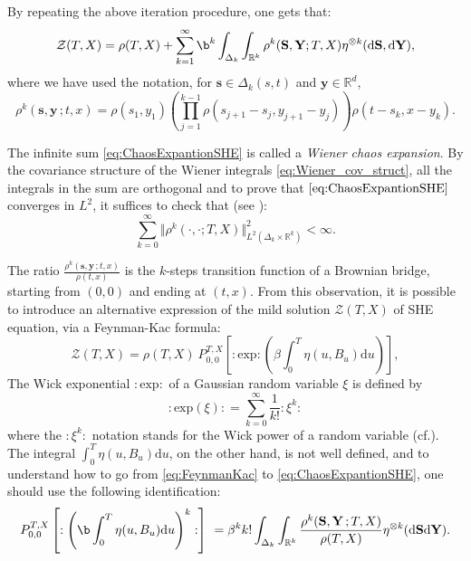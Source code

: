 By repeating the above iteration procedure, one gets that:
\begin{equation} \label{eq:ChaosExpantionSHE}
\mathcal{Z}(T,X) = \rho(T,X) + \sum_{k=1}^\infty \b^k \int_{\Delta_k} \int_{\mathbb{R}^k} \rho^k(\mathbf{S},\mathbf{Y};T,X) \eta^{\otimes k}(\mathrm{d}\mathbf{S},\mathrm{d}\mathbf{Y}),
\end{equation}
where we have used the notation, for $\mathbf{s}\in \Delta_k(s,t)$ and $\mathbf{y}\in\mathbb{R}^d$,
\begin{equation*}
\rho^k(\mathbf{s},\mathbf{y} \, ; t,x)= \rho(s_1,y_1) \left( \prod_{j=1}^{k-1} \rho(s_{j+1}-s_j,y_{j+1}-y_j) \right) \rho(t-s_k,x-y_k).
\end{equation*}

The infinite sum \eqref{eq:ChaosExpantionSHE} is called a \emph{Wiener chaos expansion}. By the covariance structure of the Wiener integrals \eqref{eq:Wiener_cov_struct}, all the integrals in the sum are orthogonal and to prove that $\eqref{eq:ChaosExpantionSHE}$ converges in $L^2$, it suffices to check that (see \cite{AlbertsKhaninQuastelCRP}):
\[\sum_{k=0}^{\infty} \Vert \rho^k(\cdot,\cdot;T,X) \Vert^2_{L^2(\Delta_k\times\mathbb{R}^k)} < \infty.\]


The ratio $\frac{\rho^k(\mathbf{s},\mathbf{y} \, ; t,x)} {\rho(t,x)} $ is the $k$-steps transition function of a Brownian bridge,  starting from $(0,0)$ and ending at $(t,x)$. From this observation, it is possible to introduce an alternative expression of 
the mild solution $\mathcal{Z}(T,X)$ of SHE equation, via a Feynman-Kac formula:
\begin{equation} \label{eq:FeynmanKac}
 \mathcal{Z}(T,X) = \rho(T,X) \  P_{0,0}^{T,X} \left[ :\mathrm{exp}:\left(\beta \int_0^T \eta(u,B_u)\mathrm{d}u\right) \right],
\end{equation}
The Wick exponential $:\mathrm{exp}:$ of a Gaussian random variable $\xi$ is defined by 
\[:\mathrm{exp}(\xi): = \sum_{k=0}^\infty \frac{1}{k!} :\xi^k:
 \]
where the $:\xi^k:$ notation stands for the Wick power of a random variable (cf.\cite{janson_1997}).
The integral $\int_0^T \eta(u,B_u)\mathrm{d}u$, on the other hand, is not well defined, and to understand how to go from \eqref{eq:FeynmanKac} to  \eqref{eq:ChaosExpantionSHE}, one should use the following identification:
\[ P_{0,0}^{T,X} \left[ :\left( \b \int_0^T \eta(u,B_u)\mathrm{d}u \right)^k : \right]  \ = \beta^k k! \int_{\Delta_k} \int_{\mathbb{R}^k} \frac{\rho^k(\mathbf{S},\mathbf{Y}\, ; T,X)}{\rho(T,X)} \eta^{\otimes k}(\mathrm{d}\mathbf{S} \mathrm{d}\mathbf{Y}).\]

